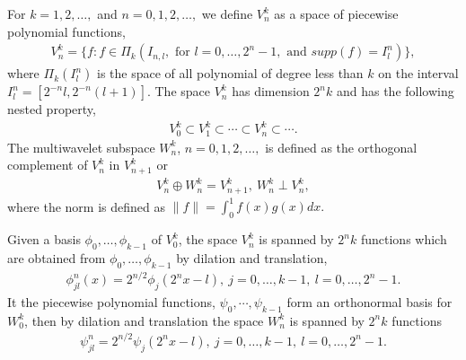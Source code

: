 \documentclass[final,leqno]{siamltex704}
\begin{document}
For $k=1,2,\dots,$ and $n=0,1,2,\dots,$ we define $V_n^k$ as a space of piecewise polynomial functions,
\begin{eqnarray}
V_n^k=\{f:f\in\Pi_k(I_{n,l},\text{ for }l=0,\dots,2^n-1,\text{ and }supp(f)=I_l^n)\},
\end{eqnarray}
where $\Pi_k(I_l^n)$ is the space of all polynomial of degree less than $k$ on the interval $I_l^n=[2^{-n}l,2^{-n}(l+1)]$. The space $V_n^k$ has dimension $2^nk$ and has the following nested property,
\begin{eqnarray}
V_0^k\subset V_1^k\subset\cdots\subset V_n^k\subset \cdots.
\end{eqnarray}
The multiwavelet subspace $W_n^k$, $n=0,1,2,\dots,$ is defined as the orthogonal complement of $V_n^k$ in $V_{n+1}^k$ or
\begin{eqnarray}
V_n^k\oplus W_n^k=V_{n+1}^k,\ W_n^k\perp V_n^k,
\end{eqnarray}
where the norm is defined as $\|f\|=\int_0^1 f(x)g(x)dx.$ 

Given a basis $\phi_0,\dots,\phi_{k-1}$ of $V_0^k$, the space $V_n^k$ is spanned by $2^nk$ functions which are obtained from $\phi_0,\dots,\phi_{k-1}$ by dilation and translation,
\begin{eqnarray}
\phi_{jl}^n(x)=2^{n/2}\phi_j(2^nx-l),\ j=0,\dots,k-1,\ l=0,\dots,2^n-1.
\end{eqnarray}
It the piecewise polynomial functions, $\psi_0,\cdots,\psi_{k-1}$ form an orthonormal basis for $W_0^k$, then by dilation and translation the space $W_n^k$ is spanned by $2^nk$ functions
\begin{eqnarray}
\psi_{jl}^n=2^{n/2}\psi_j(2^nx-l),\ j=0,\dots,k-1,\ l=0,\dots,2^n-1.
\end{eqnarray}
\end{document}

